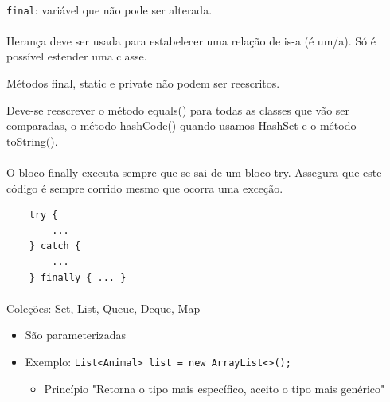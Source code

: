 \documentclass[../resumosLPOO.tex]{subfiles}
\begin{document}
\paragraph{}

\lstinline{final}: variável que não pode ser alterada.

\paragraph{}

Herança deve ser usada para estabelecer uma relação de is-a (é um/a). Só é possível estender uma classe.

Métodos final, static e private não podem ser reescritos.

Deve-se reescrever o método equals() para todas as classes que vão ser comparadas, o método hashCode() quando usamos HashSet e o método toString().

\paragraph{}

O bloco finally executa sempre que se sai de um bloco try. Assegura que este código é sempre corrido mesmo que ocorra uma exceção.

\begin{lstlisting}
    try {
        ...
    } catch {
        ...
    } finally { ... }
\end{lstlisting}

\paragraph{}

Coleções: Set, List, Queue, Deque, Map
\begin{itemize}
    \item São parameterizadas
    \item Exemplo: \lstinline{List<Animal> list = new ArrayList<>();}
    \begin{itemize}
        \item Princípio "Retorna o tipo mais específico, aceito o tipo mais genérico"
    \end{itemize}
\end{itemize}
\end{document}

